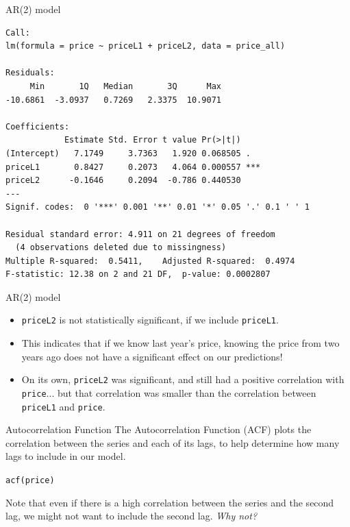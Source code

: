 \documentclass{beamer}\usepackage[]{graphicx}\usepackage[]{color}
\makeatletter
\newcommand{\hlstd}[1]{\textcolor[rgb]{1,0.894,0.769}{#1}}%
\newcommand{\hlkwd}[1]{\textcolor[rgb]{1,0.78,0.769}{#1}}%
\newenvironment{kframe}{%
 \def\at@end@of@kframe{}%
 \ifinner\ifhmode%
  \def\at@end@of@kframe{\end{minipage}}%
  \begin{minipage}{\columnwidth}%
 \fi\fi%
 \def\FrameCommand##1{\hskip\@totalleftmargin \hskip-\fboxsep
 \colorbox{shadecolor}{##1}\hskip-\fboxsep
     \hskip-\linewidth \hskip-\@totalleftmargin \hskip\columnwidth}%
 \MakeFramed {\advance\hsize-\width
   \@totalleftmargin\z@ \linewidth\hsize
   \@setminipage}}%
 {\par\unskip\endMakeFramed%
 \at@end@of@kframe}
\newenvironment{knitrout}{}{} %
\makeatother
\begin{document}
\begin{darkframes}
\begin{frame}[fragile]{AR(2) model}
\begin{knitrout}
\begin{kframe}
\begin{verbatim}
Call:
lm(formula = price ~ priceL1 + priceL2, data = price_all)

Residuals:
     Min       1Q   Median       3Q      Max 
-10.6861  -3.0937   0.7269   2.3375  10.9071 

Coefficients:
            Estimate Std. Error t value Pr(>|t|)    
(Intercept)   7.1749     3.7363   1.920 0.068505 .  
priceL1       0.8427     0.2073   4.064 0.000557 ***
priceL2      -0.1646     0.2094  -0.786 0.440530    
---
Signif. codes:  0 '***' 0.001 '**' 0.01 '*' 0.05 '.' 0.1 ' ' 1

Residual standard error: 4.911 on 21 degrees of freedom
  (4 observations deleted due to missingness)
Multiple R-squared:  0.5411,	Adjusted R-squared:  0.4974 
F-statistic: 12.38 on 2 and 21 DF,  p-value: 0.0002807
\end{verbatim}
\end{kframe}
\end{knitrout}
\end{frame}



\begin{frame}[fragile]{AR(2) model}
      \begin{itemize}
      \item \texttt{priceL2} is not statistically significant, if we include \texttt{priceL1}.
      \pause
      \item This indicates that if we know last year's price, knowing the price from two years ago does not have a significant effect on our predictions!
      \pause
      \item On its own, \texttt{priceL2} was significant, and still had a positive correlation with \texttt{price}... but that correlation was smaller than the correlation between \texttt{priceL1} and \texttt{price}.
      \end{itemize}
\end{frame}

\begin{frame}[fragile]{Autocorrelation Function}
      The \alert{Autocorrelation Function (ACF)} plots the correlation between the series and each of its lags, to help determine how many lags to include in our model.
\begin{knitrout}
\begin{kframe}
\begin{alltt}
\hlkwd{acf}\hlstd{(price)}
\end{alltt}
\end{kframe}


\end{knitrout}

      Note that even if there is a high correlation between the series and the second lag, we might not want to include the second lag. \textit{Why not?}

\end{frame}




  \end{darkframes}
\end{document}
